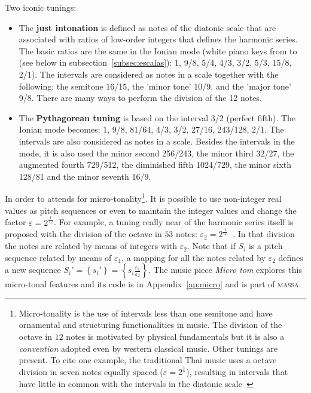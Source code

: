 \documentclass[
 aip,
 jmp,
 amsmath,amssymb,
 reprint,
]{revtex4-1}
\newcommand{\massa}{{\large \textsc{massa}}}
\begin{document}
Two iconic tunings:

\begin{itemize}
    \item The {\bf just intonation} is defined as notes of the diatonic scale
    that are associated with ratios of low-order integers that defines the harmonic
    series. The basic ratios are the same in the Ionian mode (white piano keys
    from \do to \do (see below in subsection~\ref{subsec:escalas}): 1, 9/8, 5/4,
    4/3, 3/2, 5/3, 15/8, 2/1). 
    The intervals are considered as notes in a scale together with the following: the
    semitone 16/15, the 'minor tone' 10/9, and the 'major tone' 9/8. There are
    many ways to perform the division of the 12 notes.

    \item The {\bf Pythagorean tuning} is based on the interval 3/2 (perfect
    fifth). The Ionian mode becomes: 1, 9/8, 81/64, 4/3, 3/2, 27/16, 243/128,
    2/1. The intervals are also considered as notes in a scale. Besides the
    intervals in the mode, it is also used the minor second 256/243, the minor
    third 32/27, the augmented fourth 729/512, the diminished fifth 1024/729,
    the minor sixth 128/81 and the minor seventh 16/9. 
\end{itemize}

In order to attends for micro-tonality\footnote{Micro-tonality is the use of intervals less
than one semitone and have ornamental and structuring functionalities in music. The
division of the octave in $12$ notes is motivated by physical fundamentals but it is also
a \emph{convention} adopted even by western classical music. Other tunings are
present. To cite one example, the traditional Thai music uses a octave
division in seven notes equally spaced ($\varepsilon=2^{\frac{1}{7}}$),
resulting in intervals that have little in common with the intervals in the
diatonic scale~\cite{Wisnick}}. It is possible to use non-integer real values as
pitch sequences or even to maintain the integer values and change the factor $\varepsilon=2^{\frac{1}{12}}$. For example, 
a tuning really near of the harmonic series
itself is proposed with the division of the octave in $53$ notes:
$\varepsilon_2=2^{\frac{1}{53}}$~\cite{microtonalidade}.
In that division the notes are related by means of integers with
$\varepsilon_2$. Note that if $S_i$ is a pitch sequence related by means of
$\varepsilon_1$, a mapping for all the notes related by $\varepsilon_2$ defines
a new sequence $S_i'=\left\{s_i'\right\}=\left\{
s_i \frac{\varepsilon_1}{\varepsilon_2}\right\}$. The music piece \emph{Micro
tom} explores this micro-tonal features and its code is in
Appendix~\ref{ap:micro} and is part of \massa.
\end{document}
